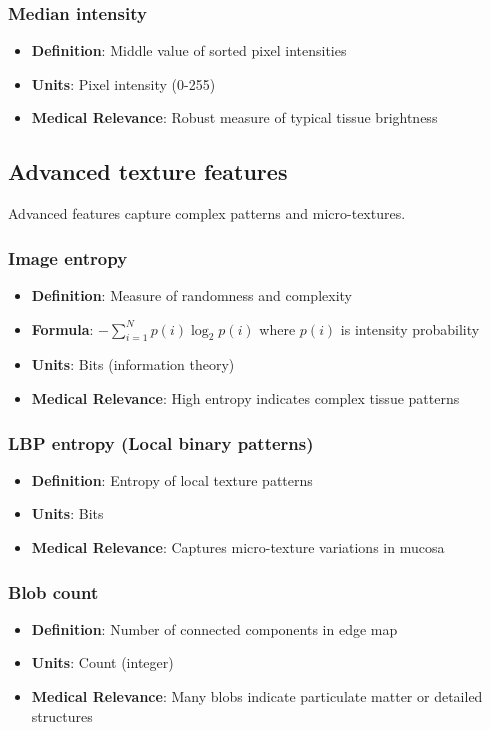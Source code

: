 \documentclass[11pt]{article}
\begin{document}
\subsubsection{Median intensity}
\begin{itemize}
    \item \textbf{Definition}: Middle value of sorted pixel intensities
    \item \textbf{Units}: Pixel intensity (0-255)
    \item \textbf{Medical Relevance}: Robust measure of typical tissue brightness
\end{itemize}

\subsection{Advanced texture features}

Advanced features capture complex patterns and micro-textures.

\subsubsection{Image entropy}
\begin{itemize}
    \item \textbf{Definition}: Measure of randomness and complexity
    \item \textbf{Formula}: $\displaystyle -\sum_{i=1}^N p(i) \log_2 p(i)$ where $p(i)$ is intensity probability
    \item \textbf{Units}: Bits (information theory)
    \item \textbf{Medical Relevance}: High entropy indicates complex tissue patterns
\end{itemize}

\subsubsection{LBP entropy (Local binary patterns)}
\begin{itemize}
    \item \textbf{Definition}: Entropy of local texture patterns
    \item \textbf{Units}: Bits
    \item \textbf{Medical Relevance}: Captures micro-texture variations in mucosa
\end{itemize}

\subsubsection{Blob count}
\begin{itemize}
    \item \textbf{Definition}: Number of connected components in edge map
    \item \textbf{Units}: Count (integer)
    \item \textbf{Medical Relevance}: Many blobs indicate particulate matter or detailed structures
\end{itemize}
\end{document}
